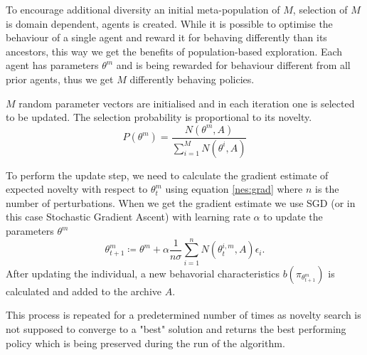 To encourage additional diversity an initial meta-population of $M$, selection of $M$ is domain dependent, agents is created. While it is possible to optimise the behaviour of a single agent and reward it for behaving differently than its ancestors, this way we get the benefits of population-based exploration.  Each agent has parameters $\theta^m$ and is being rewarded for behaviour different from all prior agents, thus we get $M$ differently behaving policies.

$M$ random parameter vectors are initialised and in each iteration one is selected to be updated. The selection probability is proportional to its novelty.
\begin{equation}
    P(\theta^m) = \frac{N(\theta^m,A)}{\sum_{i=1}^M N(\theta^i,A)}
\end{equation}

To perform the update step, we need to calculate the gradient estimate of expected novelty with respect to $\theta^m_t$ using equation \ref{nes:grad} where $n$ is the number of perturbations. When we get the gradient estimate we use SGD (or in this case Stochastic Gradient Ascent) with learning rate $\alpha$ to update the parameters $\theta^m$
\begin{equation}
    \label{eq:ns-es-update}
    \theta^m_{t+1}\coloneqq\theta^m + \alpha \frac{1}{n\sigma}\sum_{i=1}^n N(\theta_t^{i,m},A)\epsilon_i.
\end{equation}
 After updating the individual, a new behavorial characteristics $b(\pi_{\theta^m_{t+1}})$ is calculated and added to the archive $A$. 

This process is repeated for a predetermined number of times as novelty search is not supposed to converge to a "best" solution and returns the best performing policy which is being preserved during the run of the algorithm.

